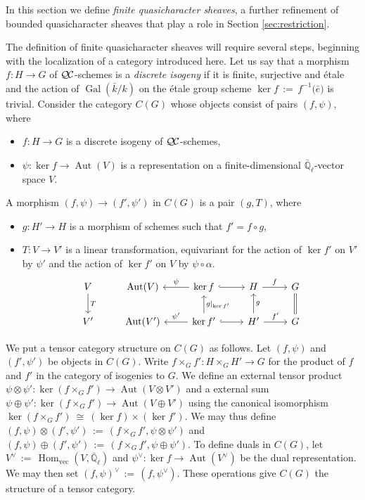 \documentclass[11pt]{amsart}
\theoremstyle{plain}
\theoremstyle{definition}
\theoremstyle{remark}
\newcommand{\EE}{\mathbb{\bar Q}_\ell}
\newcommand{\bFq}{\bar{k}}
\newcommand{\Fq}{k}
\DeclareMathOperator{\Gal}{Gal}
\DeclareMathOperator{\Aut}{Aut}
\DeclareMathOperator{\Hom}{Hom}
\newcommand{\ceq}{{\, :=\, }}
\newcommand{\iso}{{\ \cong\ }}
\newcommand{\QC}{{\mathcal{Q\hskip-0.8pt C}}}
\begin{document}
In this section we define \emph{finite quasicharacter sheaves}, a further refinement
of bounded quasicharacter sheaves that play a role in Section \ref{sec:restriction}.

The definition of finite quasicharacter sheaves will require several steps, 
beginning with the localization of a category introduced here.
Let us say that a morphism $f : H\to G$ of $\QC$-schemes is a \emph{discrete isogeny}
if it is finite, surjective and \'etale and the action of $\Gal(\bFq/\Fq)$ on the \'etale group
scheme $\ker f \ceq f^{-1}({\bar e)}$ is trivial.
Consider the category $C(G)$ whose objects consist of pairs $(f,\psi)$, where
\begin{itemize}
\item $f : H\to G$ is a discrete isogeny of $\QC$-schemes,
\item $\psi : \ker f\to \Aut(V)$ is a representation on a finite-dimensional $\EE$-vector space $V$.
\end{itemize}
A morphism $(f,\psi) \to (f',\psi')$ in $C(G)$ is a pair $(g,T)$, where
\begin{itemize}
\item $g : H' \to H$ is a morphism of schemes such that $f' = f\circ g$,
\item $T : V\to V'$ is a linear transformation, equivariant for the action of
$\ker f'$ on $V'$ by $\psi'$ and the action of $\ker f'$ on $V$ by $\psi \circ \alpha$.
\[
\begin{tikzcd}
V \arrow{d}{T} & \Aut(V) & \arrow[swap]{l}{\psi} \ker f \arrow[hook]{r} & H \arrow{r}{f} & \arrow[equal]{d} G\\
V' & \Aut(V') & \arrow[swap]{l}{\psi'} \arrow[swap]{u}{g\vert_{\ker f'}} \ker f' \arrow[hook]{r} & \arrow[swap]{u}{g} H' \arrow{r}{f'} & G
\end{tikzcd}
\]
\end{itemize}

We put a tensor category structure on $C(G)$ as follows.
Let $(f,\psi)$ and $(f',\psi')$ be objects in $C(G)$. 
Write $f\times_G f' : H\times_G H' \to G$ for the product of $f$ and $f'$
in the category of isogenies to $G$. We define an external tensor product
$\psi \otimes\psi' :  \ker(f\times_G f') \to \Aut(V\otimes V')$ and a external sum
$\psi \oplus\psi' :  \ker(f\times_G f') \to \Aut(V\oplus V')$
using the canonical isomorphism $\ker(f\times_G f') \iso (\ker f)\times (\ker f')$.
We may thus define $(f,\psi)\otimes(f',\psi') \ceq (f\times_G f' ,\psi\otimes\psi')$ and
$(f,\psi)\oplus(f',\psi')\ceq (f\times_G f' ,\psi\oplus\psi')$. To define duals in $C(G)$,
let $V^\vee \ceq \Hom_\text{vec}(V,\EE)$ and $\psi^\vee : \ker f \to \Aut(V^\vee)$ be
the dual representation.  We may then set $(f,\psi)^\vee \ceq (f,\psi^\vee)$.
These operations give $C(G)$ the structure of a tensor category.
\end{document}

